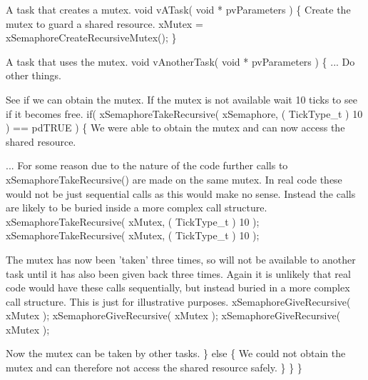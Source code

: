 \begin{DoxyPre}A task that creates a mutex.
 void vATask( void * pvParameters )
 \{
Create the mutex to guard a shared resource.
    xMutex = xSemaphoreCreateRecursiveMutex();
 \}\end{DoxyPre}



\begin{DoxyPre}A task that uses the mutex.
 void vAnotherTask( void * pvParameters )
 \{
... Do other things.
\begin{DoxyVerb}if( xMutex != NULL )
{
\end{DoxyVerb}

See if we can obtain the mutex.  If the mutex is not available
wait 10 ticks to see if it becomes free.
        if( xSemaphoreTakeRecursive( xSemaphore, ( TickType\_t ) 10 ) == pdTRUE )
        \{
We were able to obtain the mutex and can now access the
shared resource.\end{DoxyPre}



\begin{DoxyPre}...
For some reason due to the nature of the code further calls to
xSemaphoreTakeRecursive() are made on the same mutex.  In real
code these would not be just sequential calls as this would make
no sense.  Instead the calls are likely to be buried inside
a more complex call structure.
            xSemaphoreTakeRecursive( xMutex, ( TickType\_t ) 10 );
            xSemaphoreTakeRecursive( xMutex, ( TickType\_t ) 10 );\end{DoxyPre}



\begin{DoxyPre}The mutex has now been 'taken' three times, so will not be
available to another task until it has also been given back
three times.  Again it is unlikely that real code would have
these calls sequentially, but instead buried in a more complex
call structure.  This is just for illustrative purposes.
            xSemaphoreGiveRecursive( xMutex );
            xSemaphoreGiveRecursive( xMutex );
            xSemaphoreGiveRecursive( xMutex );\end{DoxyPre}



\begin{DoxyPre}Now the mutex can be taken by other tasks.
        \}
        else
        \{
We could not obtain the mutex and can therefore not access
the shared resource safely.
        \}
    \}
 \}
 \end{DoxyPre}
 